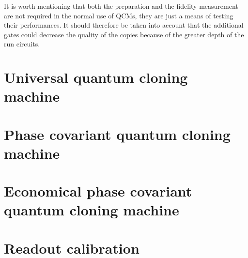 It is worth mentioning that both the preparation and the fidelity measurement are not required in the normal use of QCMs, they are just a means of testing their performances.
It should therefore be taken into account that the additional gates could decrease the quality of the copies because of the greater depth of the run circuits.
\section{Universal quantum cloning machine}
\section{Phase covariant quantum cloning machine}
\section{Economical phase covariant quantum cloning machine}
\section{Readout calibration}
